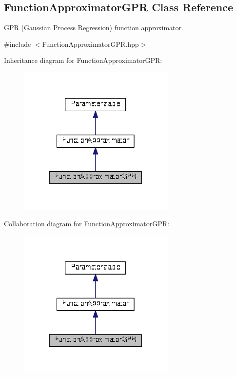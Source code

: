 \hypertarget{classDmpBbo_1_1FunctionApproximatorGPR}{\subsection{Function\+Approximator\+G\+P\+R Class Reference}
\label{classDmpBbo_1_1FunctionApproximatorGPR}
}


G\+P\+R (Gaussian Process Regression) function approximator.  




{\ttfamily \#include $<$Function\+Approximator\+G\+P\+R.\+hpp$>$}



Inheritance diagram for Function\+Approximator\+G\+P\+R\+:
\nopagebreak
\begin{figure}[H]
\begin{center}
\leavevmode
\includegraphics[width=222pt]{classDmpBbo_1_1FunctionApproximatorGPR__inherit__graph}
\end{center}
\end{figure}


Collaboration diagram for Function\+Approximator\+G\+P\+R\+:
\nopagebreak
\begin{figure}[H]
\begin{center}
\leavevmode
\includegraphics[width=222pt]{classDmpBbo_1_1FunctionApproximatorGPR__coll__graph}
\end{center}
\end{figure}
